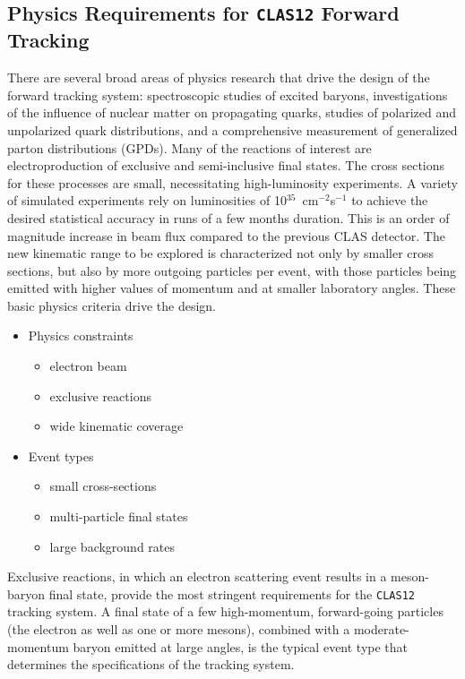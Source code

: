 \subsection{Physics Requirements for {\tt CLAS12} Forward Tracking}

There are several broad areas of physics research that drive 
the design of the forward tracking system: 
spectroscopic studies of excited baryons, investigations of 
the influence of nuclear matter on propagating quarks, studies of polarized 
and unpolarized quark distributions, and a comprehensive measurement of 
generalized parton distributions (GPDs).  Many of the reactions of interest 
are electroproduction of exclusive and semi-inclusive final states.  The 
cross sections for these processes are small, necessitating high-luminosity 
experiments.  A variety of simulated experiments rely on luminosities of 
10$^{35}$~cm$^{-2}$s$^{-1}$ to achieve the desired statistical accuracy in 
runs of a few months duration.  This is an order of magnitude increase
in beam flux compared to the previous CLAS detector.  
The new kinematic range to be explored is 
characterized not only by smaller cross sections, but also by more outgoing 
particles per event, with those particles being emitted with higher values 
of momentum and at smaller laboratory angles.  These basic physics criteria 
drive the design. 

\begin{itemize}
\item Physics constraints
\begin{itemize}
\item electron beam
\item exclusive reactions
\item wide kinematic coverage
\end{itemize}
\item Event types
\begin{itemize}
\item small cross-sections
\item multi-particle final states
\item large background rates
\end{itemize}
\end{itemize}


Exclusive reactions, in which an electron scattering event 
results in a meson-baryon final state, provide the most 
stringent requirements for the {\tt CLAS12} tracking system.  A final state 
of a few high-momentum, forward-going particles (the electron as well as one 
or more mesons), combined with a moderate-momentum baryon emitted at large 
angles, is the typical event type that determines the specifications of the 
tracking system.


